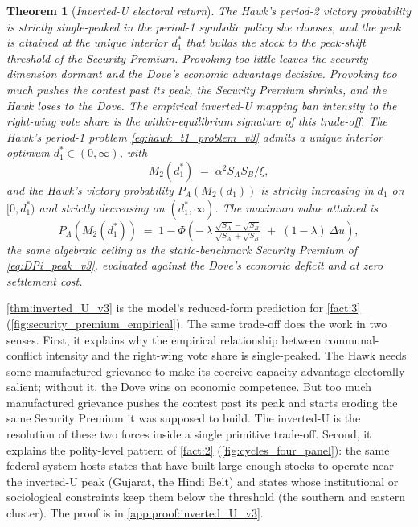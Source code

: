 \documentclass[11pt,twoside]{extarticle}
\newtheorem{theorem}{Theorem}
\begin{document}
\begin{theorem}[\emph{Inverted-U electoral return}]\label{thm:inverted_U_v3}
\emph{The Hawk's period-2 victory probability is strictly single-peaked in the period-1 symbolic policy she chooses, and the peak is attained at the unique interior $d_1^*$ that builds the stock to the peak-shift threshold of the Security Premium. Provoking too little leaves the security dimension dormant and the Dove's economic advantage decisive. Provoking too much pushes the contest past its peak, the Security Premium shrinks, and the Hawk loses to the Dove. The empirical inverted-U mapping ban intensity to the right-wing vote share is the within-equilibrium signature of this trade-off.}
The Hawk's period-1 problem \autoref{eq:hawk_t1_problem_v3} admits a unique interior optimum $d_1^*\in(0,\infty)$, with
\begin{equation}\label{eq:d1_optimum_v3}
    M_2(d_1^*)\;=\;\alpha^2 S_A S_B/\xi,
\end{equation}
and the Hawk's victory probability $P_A(M_2(d_1))$ is strictly increasing in $d_1$ on $[0,d_1^*)$ and strictly decreasing on $(d_1^*,\infty)$. The maximum value attained is
\begin{equation}\label{eq:Hawk_win_max_v3}
    P_A(M_2(d_1^*))\;=\;1-\Phi\!\left(-\,\lambda\,\tfrac{\sqrt{S_A}-\sqrt{S_B}}{\sqrt{S_A}+\sqrt{S_B}}\;+\;(1-\lambda)\,\Delta u\right),
\end{equation}
the same algebraic ceiling as the static-benchmark Security Premium of \autoref{eq:DPi_peak_v3}, evaluated against the Dove's economic deficit and at zero settlement cost.
\end{theorem}

\autoref{thm:inverted_U_v3} is the model's reduced-form prediction for \autoref{fact:3} (\autoref{fig:security_premium_empirical}). The same trade-off does the work in two senses. First, it explains why the empirical relationship between communal-conflict intensity and the right-wing vote share is single-peaked. The Hawk needs some manufactured grievance to make its coercive-capacity advantage electorally salient; without it, the Dove wins on economic competence. But too much manufactured grievance pushes the contest past its peak and starts eroding the same Security Premium it was supposed to build. The inverted-U is the resolution of these two forces inside a single primitive trade-off. Second, it explains the polity-level pattern of \autoref{fact:2} (\autoref{fig:cycles_four_panel}): the same federal system hosts states that have built large enough stocks to operate near the inverted-U peak (Gujarat, the Hindi Belt) and states whose institutional or sociological constraints keep them below the threshold (the southern and eastern cluster). The proof is in \autoref{app:proof:inverted_U_v3}.
\end{document}
